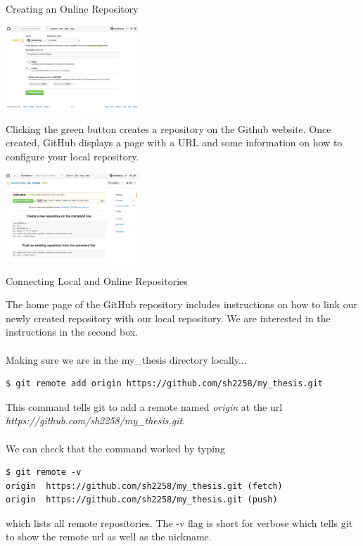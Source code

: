\documentclass[10pt]{beamer}
\begin{document}
\begin{frame}[fragile]{Creating an Online Repository}

\begin{center}
\includegraphics[width=5cm]{./auxfiles/Ghub1.jpg}
\end{center}
Clicking the green button creates a repository on the Github website. Once created, GitHub displays a page with a URL and some information on how to configure your local repository. 
\begin{center}
\includegraphics[width=5cm]{./auxfiles/Ghub2.jpg}
\end{center}
\end{frame}

\begin{frame}[fragile]{Connecting Local and Online Repositories}

The home page of the GitHub repository includes instructions on how to link our newly created repository with our local repository.  We are interested in the instructions in the second box.\\~\\

Making sure we are in the my\_thesis directory locally...
\begin{lstlisting}
$ git remote add origin https://github.com/sh2258/my_thesis.git
\end{lstlisting}
This command tells git to add a remote named \emph{origin} at the url \emph{https://github.com/sh2258/my\_thesis.git}.\\~\\

We can check that the command worked by typing
\begin{lstlisting}[frame=single]
$ git remote -v
origin	https://github.com/sh2258/my_thesis.git (fetch)
origin	https://github.com/sh2258/my_thesis.git (push)
\end{lstlisting}
which lists all remote repositories. The -v flag is short for verbose which tells git to show the remote url as well as the nickname.\\

\end{frame}
\end{document}

